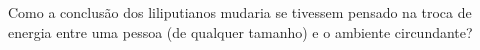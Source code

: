 Como a conclusão dos liliputianos mudaria se tivessem pensado na troca de energia entre uma pessoa (de qualquer tamanho) e o ambiente circundante?

